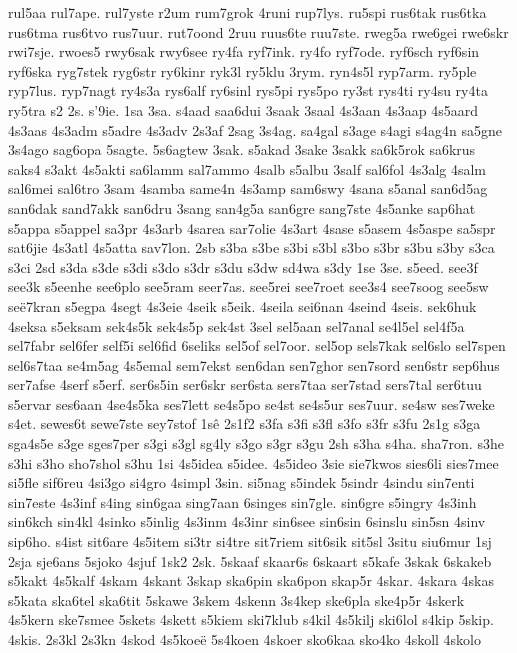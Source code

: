 rul5aa
rul7ape.
rul7yste
r2um
rum7grok
4runi
rup7lys.
ru5spi
rus6tak
rus6tka
rus6tma
rus6tvo
rus7uur.
rut7oond
2ruu
ruus6te
ruu7ste.
rweg5a
rwe6gei
rwe6skr
rwi7sje.
rwoes5
rwy6sak
rwy6see
ry4fa
ryf7ink.
ry4fo
ryf7ode.
ryf6sch
ryf6sin
ryf6ska
ryg7stek
ryg6str
ry6kinr
ryk3l
ry5klu
3rym.
ryn4s5l
ryp7arm.
ry5ple
ryp7lus.
ryp7nagt
ry4s3a
rys6alf
ry6sinl
rys5pi
rys5po
ry3st
rys4ti
ry4su
ry4ta
ry5tra
s2
2s.
s'9ie.
1sa
3sa.
s4aad
saa6dui
3saak
3saal
4s3aan
4s3aap
4s5aard
4s3aas
4s3adm
s5adre
4s3adv
2s3af
2sag
3s4ag.
sa4gal
s3age
s4agi
s4ag4n
sa5gne
3s4ago
sag6opa
5sagte.
5s6agtew
3sak.
s5akad
3sake
3sakk
sa6k5rok
sa6krus
saks4
s3akt
4s5akti
sa6lamm
sal7ammo
4salb
s5albu
3salf
sal6fol
4s3alg
4salm
sal6mei
sal6tro
3sam
4samba
same4n
4s3amp
sam6swy
4sana
s5anal
san6d5ag
san6dak
sand7akk
san6dru
3sang
san4g5a
san6gre
sang7ste
4s5anke
sap6hat
s5appa
s5appel
sa3pr
4s3arb
4sarea
sar7olie
4s3art
4sase
s5asem
4s5aspe
sa5spr
sat6jie
4s3atl
4s5atta
sav7lon.
2sb
s3ba
s3be
s3bi
s3bl
s3bo
s3br
s3bu
s3by
s3ca
s3ci
2sd
s3da
s3de
s3di
s3do
s3dr
s3du
s3dw
sd4wa
s3dy
1se
3se.
s5eed.
see3f
see3k
s5eenhe
see6plo
see5ram
seer7as.
see5rei
see7roet
see3s4
see7soog
see5sw
seë7kran
s5egpa
4segt
4s3eie
4seik
s5eik.
4seila
sei6nan
4seind
4seis.
sek6huk
4seksa
s5eksam
sek4s5k
sek4s5p
sek4st
3sel
sel5aan
sel7anal
se4l5el
sel4f5a
sel7fabr
sel6fer
self5i
sel6fid
6seliks
sel5of
sel7oor.
sel5op
sels7kak
sel6slo
sel7spen
sel6s7taa
se4m5ag
4s5emal
sem7ekst
sen6dan
sen7ghor
sen7sord
sen6str
sep6hus
ser7afse
4serf
s5erf.
ser6s5in
ser6skr
ser6sta
sers7taa
ser7stad
sers7tal
ser6tuu
s5ervar
ses6aan
4se4s5ka
ses7lett
se4s5po
se4st
se4s5ur
ses7uur.
se4sw
ses7weke
s4et.
sewes6t
sewe7ste
sey7stof
1sê
2s1f2
s3fa
s3fi
s3fl
s3fo
s3fr
s3fu
2s1g
s3ga
sga4s5e
s3ge
sges7per
s3gi
s3gl
sg4ly
s3go
s3gr
s3gu
2sh
s3ha
s4ha.
sha7ron.
s3he
s3hi
s3ho
sho7shol
s3hu
1si
4s5idea
s5idee.
4s5ideo
3sie
sie7kwos
sies6li
sies7mee
si5fle
sif6reu
4si3go
si4gro
4simpl
3sin.
si5nag
s5indek
5sindr
4sindu
sin7enti
sin7este
4s3inf
s4ing
sin6gaa
sing7aan
6singes
sin7gle.
sin6gre
s5ingry
4s3inh
sin6kch
sin4kl
4sinko
s5inlig
4s3inm
4s3inr
sin6see
sin6sin
6sinslu
sin5sn
4sinv
sip6ho.
s4ist
sit6are
4s5item
si3tr
si4tre
sit7riem
sit6sik
sit5sl
3situ
siu6mur
1sj
2sja
sje6ans
5sjoko
4sjuf
1sk2
2sk.
5skaaf
skaar6s
6skaart
s5kafe
3skak
6skakeb
s5kakt
4s5kalf
4skam
4skant
3skap
ska6pin
ska6pon
skap5r
4skar.
4skara
4skas
s5kata
ska6tel
ska6tit
5skawe
3skem
4skenn
3s4kep
ske6pla
ske4p5r
4skerk
4s5kern
ske7smee
5skets
4skett
s5kiem
ski7klub
s4kil
4s5kilj
ski6lol
s4kip
5skip.
4skis.
2s3kl
2s3kn
4skod
4s5koeë
5s4koen
4skoer
sko6kaa
sko4ko
4skoll
4skolo
